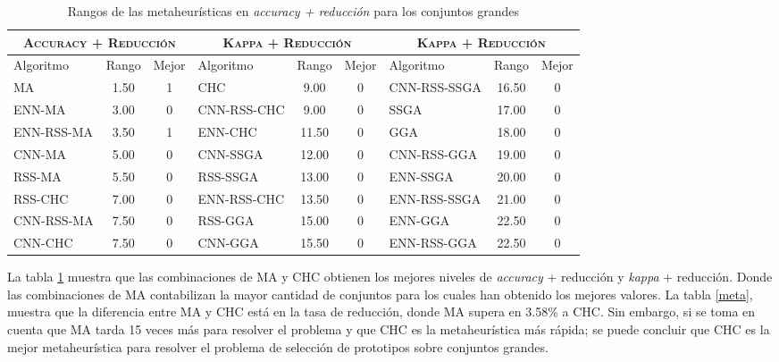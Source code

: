 \begin{table}[h!]
\centering
\begin{adjustbox}{max width =\textwidth}
\begin{tabular}{l c c|l c c|l c c}
\hline
\multicolumn{3}{c|}{\textsc{Accuracy + Reducción}}
	& \multicolumn{3}{c}{\textsc{Kappa + Reducción}}
	& \multicolumn{3}{c}{\textsc{Kappa + Reducción}} \\
\hline
Algoritmo & Rango & Mejor & Algoritmo & Rango & Mejor & Algoritmo & Rango & Mejor \\
\hline
\hline

MA           & 1.50  & 1 & CHC          & 9.00  & 0 & CNN-RSS-SSGA & 16.50 & 0 \\
ENN-MA       & 3.00  & 0 & CNN-RSS-CHC  & 9.00  & 0 & SSGA         & 17.00 & 0 \\
ENN-RSS-MA   & 3.50  & 1 & ENN-CHC      & 11.50 & 0 & GGA          & 18.00 & 0 \\
CNN-MA       & 5.00  & 0 & CNN-SSGA     & 12.00 & 0 & CNN-RSS-GGA  & 19.00 & 0 \\
RSS-MA       & 5.50  & 0 & RSS-SSGA     & 13.00 & 0 & ENN-SSGA     & 20.00 & 0 \\
RSS-CHC      & 7.00  & 0 & ENN-RSS-CHC  & 13.50 & 0 & ENN-RSS-SSGA & 21.00 & 0 \\
CNN-RSS-MA   & 7.50  & 0 & RSS-GGA      & 15.00 & 0 & ENN-GGA      & 22.50 & 0 \\
CNN-CHC      & 7.50  & 0 & CNN-GGA      & 15.50 & 0 & ENN-RSS-GGA  & 22.50 & 0 \\

 

\hline
\end{tabular}
\end{adjustbox}
\caption{Rangos de las metaheurísticas en \emph{accuracy + reducción} para los conjuntos grandes}
\label{rank-large}
\end{table}

La tabla \ref{rank-large} muestra que las combinaciones de MA y CHC obtienen los mejores niveles de \emph{accuracy} + reducción y \emph{kappa} + reducción. Donde las combinaciones de MA contabilizan la mayor cantidad de conjuntos para los cuales han obtenido los mejores valores. La tabla \ref{meta}, muestra que la diferencia entre MA y CHC está en la tasa de reducción, donde MA supera en 3.58\% a CHC. Sin embargo, si se toma en cuenta que MA tarda 15 veces más para resolver el problema y que CHC es la metaheurística más rápida; se puede concluir que CHC es la mejor metaheurística para resolver el problema de selección de prototipos sobre conjuntos grandes.


